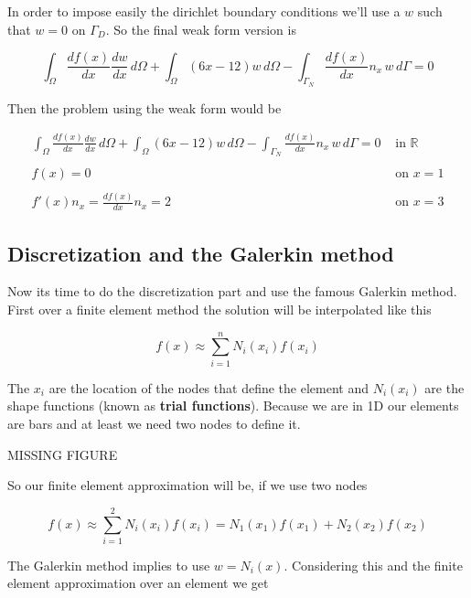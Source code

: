 \documentclass[letterpaper,10pt]{article}
\begin{document}
In order to impose easily the dirichlet boundary conditions we'll use a $w$ such that $w=0$ on $\Gamma_D$. So the final weak form version is

\begin{equation}
\int_{\Omega} \frac{d f(x)}{d x} \frac{d w}{d x} \, d\Omega + \int_{\Omega} (6x-12) w \, d\Omega - \int_{\Gamma_N} \frac{d f(x)}{d x} n_x \, w \, d\Gamma = 0
\end{equation}

Then the problem using the weak form would be

\begin{equation}
\begin{array}{rl}
\displaystyle
\int_{\Omega} \frac{d f(x)}{d x} \frac{d w}{d x} \, d\Omega + \int_{\Omega} (6x-12) w \, d\Omega - \int_{\Gamma_N} \frac{d f(x)}{d x} n_x \, w \, d\Gamma = 0 & \textrm{ in } \mathbb{R} \\ \\
\displaystyle
f(x) = 0 & \textrm{ on } x = 1 \\ \\
\displaystyle
f'(x) n_x = \frac{d f(x)}{d x} n_x = 2 & \textrm{ on } x = 3 
\end{array}
\label{eq:Problem_WeakForm}
\end{equation}

\subsection{Discretization and the Galerkin method}

Now its time to do the discretization part and use the famous Galerkin method. First over a finite element method the solution will be interpolated like this

\begin{equation}
f(x) \approx \sum_{i=1}^n N_i(x_i) f(x_i)
\end{equation}

The $x_i$ are the location of the nodes that define the element and $N_i(x_i)$ are the shape functions (known as \textbf{trial functions}). Because we are in 1D our elements are bars and at least we need two nodes to define it.

MISSING FIGURE

So our finite element approximation will be, if we use two nodes

\[
f(x) \approx \sum_{i=1}^2 N_i(x_i) f(x_i) = N_1(x_1) f(x_1) + N_2(x_2) f(x_2)
\]

The Galerkin method implies to use $w=N_i(x)$. Considering this and the finite element approximation over an element we get
\end{document}
